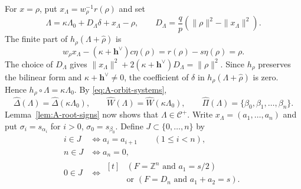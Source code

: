 \documentclass[11pt,a4paper]{amsart}
\newcommand{\ZZ}{\mathbb Z}
\theoremstyle{plain}
\numberwithin{equation}{section}
\begin{document}
For \(x=\rho\), put \(x_\Lambda=w_\rho^{-1}r(\rho)\) and set
\begin{equation}
\Lambda=\kappa\Lambda_0+D_\Lambda\delta+x_\Lambda-\rho,
\qquad
D_\Lambda=\frac qp(\|\rho\|^2-\|x_\Lambda\|^2).
\label{eq:A-Lambda}
\end{equation}
The finite part of \(h_\rho(\Lambda+\widehat\rho)\) is
\[
w_\rho x_\Lambda-(\kappa+\mathbf{h}^\vee)c\eta(\rho)
=r(\rho)-s\eta(\rho)=\rho.
\]
The choice of \(D_\Lambda\) gives
\(\|x_\Lambda\|^2+2(\kappa+\mathbf{h}^\vee)D_\Lambda=\|\rho\|^2\).
Since \(h_\rho\) preserves the bilinear form and
\(\kappa+\mathbf{h}^\vee\ne0\), the coefficient of \(\delta\) in
\(h_\rho(\Lambda+\widehat\rho)\) is zero. Hence
\(h_\rho\circ\Lambda=\kappa\Lambda_0\).
By \eqref{eq:A-orbit-systems},
\[
\widehat\Delta(\Lambda)=\widehat\Delta(\kappa\Lambda_0),\qquad
\widehat W(\Lambda)=\widehat W(\kappa\Lambda_0),\qquad
\widehat\Pi(\Lambda)=\{\beta_0,\beta_1,\ldots,\beta_n\}.
\]
Lemma~\ref{lem:A-root-signs} now shows that \(\Lambda\in\mathcal C^+\).
Write
$x_\Lambda=(a_1,\ldots,a_n)$ and put $\sigma_i=s_{\alpha_i}$ for
$i>0$, $\sigma_0=s_{\beta_0}$. Define
\(J\subset\{0,\ldots,n\}\) by
\begin{equation}
\begin{aligned}
i\in J&\Longleftrightarrow a_i=a_{i+1}
\qquad(1\le i<n),\\
n\in J&\Longleftrightarrow a_n=0,\\
0\in J&\Longleftrightarrow
\begin{aligned}[t]
&(F=\ZZ^n\text{ and }a_1=s/2)\\
&\text{or }(F=D_n\text{ and }a_1+a_2=s).
\end{aligned}
\end{aligned}
\label{eq:A-J}
\end{equation}
\end{document}
